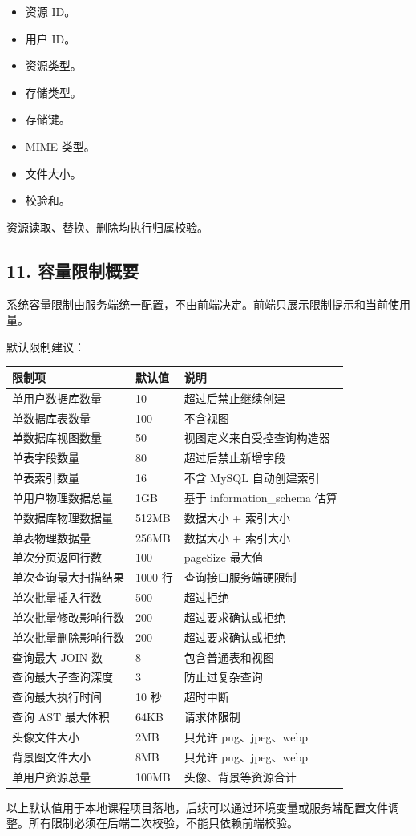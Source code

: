 \documentclass[
  a4paper,
  UTF8]{ctexart}
\providecommand{\tightlist}{%
  \setlength{\itemsep}{0pt}\setlength{\parskip}{0pt}}
\begin{document}
\begin{itemize}
\tightlist
\item
  资源 ID。
\item
  用户 ID。
\item
  资源类型。
\item
  存储类型。
\item
  存储键。
\item
  MIME 类型。
\item
  文件大小。
\item
  校验和。
\end{itemize}

资源读取、替换、删除均执行归属校验。

\hypertarget{ux5bb9ux91cfux9650ux5236ux6982ux8981}{%
\subsection{11.
容量限制概要}\label{ux5bb9ux91cfux9650ux5236ux6982ux8981}}

系统容量限制由服务端统一配置，不由前端决定。前端只展示限制提示和当前使用量。

默认限制建议：

\begin{longtable}[]{@{}lll@{}}
\toprule
限制项 & 默认值 & 说明 \\
\midrule
\endhead
单用户数据库数量 & 10 & 超过后禁止继续创建 \\
单数据库表数量 & 100 & 不含视图 \\
单数据库视图数量 & 50 & 视图定义来自受控查询构造器 \\
单表字段数量 & 80 & 超过后禁止新增字段 \\
单表索引数量 & 16 & 不含 MySQL 自动创建索引 \\
单用户物理数据总量 & 1GB & 基于 information\_schema 估算 \\
单数据库物理数据量 & 512MB & 数据大小 + 索引大小 \\
单表物理数据量 & 256MB & 数据大小 + 索引大小 \\
单次分页返回行数 & 100 & pageSize 最大值 \\
单次查询最大扫描结果 & 1000 行 & 查询接口服务端硬限制 \\
单次批量插入行数 & 500 & 超过拒绝 \\
单次批量修改影响行数 & 200 & 超过要求确认或拒绝 \\
单次批量删除影响行数 & 200 & 超过要求确认或拒绝 \\
查询最大 JOIN 数 & 8 & 包含普通表和视图 \\
查询最大子查询深度 & 3 & 防止过复杂查询 \\
查询最大执行时间 & 10 秒 & 超时中断 \\
查询 AST 最大体积 & 64KB & 请求体限制 \\
头像文件大小 & 2MB & 只允许 png、jpeg、webp \\
背景图文件大小 & 8MB & 只允许 png、jpeg、webp \\
单用户资源总量 & 100MB & 头像、背景等资源合计 \\
\bottomrule
\end{longtable}

以上默认值用于本地课程项目落地，后续可以通过环境变量或服务端配置文件调整。所有限制必须在后端二次校验，不能只依赖前端校验。
\end{document}
